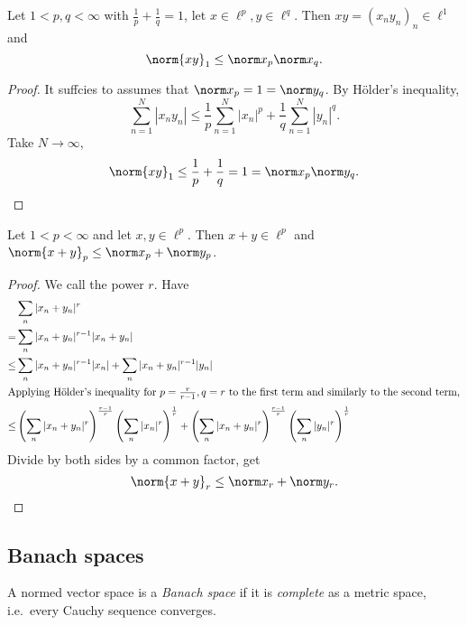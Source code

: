 \documentclass[a4paper]{article}
\begin{document}
\begin{theorem}
  Let \(1 < p, q < \infty\) with \(\frac{1}{p} + \frac{1}{q} = 1\), let \(x \in \ell^p, y \in \ell^q\). Then \(xy = (x_ny_n)_n \in \ell^1\) and
  \[
    \norm{xy}_1 \leq \norm x_p \norm x_q.
  \]
\end{theorem}

\begin{proof}
  It suffcies to assumes that \(\norm x_p = 1 = \norm y_q\). By Hölder's inequality,
  \[
    \sum_{n = 1}^N |x_n y_n| \leq \frac{1}{p} \sum_{n = 1}^N |x_n|^p + \frac{1}{q} \sum_{n = 1}^N |y_n|^q.
  \]
  Take \(N \to \infty\),
  \[
    \norm{xy}_1 \leq \frac{1}{p} + \frac{1}{q} = 1 = \norm x_p \norm y_q.
  \]
\end{proof}

\begin{theorem}
  Let \(1 < p < \infty\) and let \(x, y \in \ell^p\). Then \(x + y \in \ell^p\) and \(\norm{x + y}_p \leq \norm x_p + \norm y_p\).
\end{theorem}

\begin{proof}
  We call the power \(r\). Have
  \begin{align*}
    & \sum_n |x_n + y_n|^r \\
    =& \sum_n |x_n + y_n|^{r - 1}|x_n + y_n| \\
    \leq& \sum_n |x_n + y_n|^{r - 1} |x_n| + \sum_n |x_n + y_n|^{r - 1} |y_n| \\
    \intertext{Applying Hölder's inequality for \(p = \frac{r}{r - 1}, q = r\) to the first term and similarly to the second term,}
    \leq& \left( \sum_n |x_n + y_n|^r \right) ^{\frac{r - 1}{r}} \left( \sum_n |x_n|^r \right)^{\frac{1}{r}} + \left( \sum_n |x_n + y_n|^r \right) ^{\frac{r - 1}{r}} \left( \sum_n |y_n|^r \right)^{\frac{1}{r}}
  \end{align*}
  Divide by both sides by a common factor, get
  \[
    \norm{x + y}_r \leq \norm x_r + \norm y_r.
  \]
\end{proof}

\subsection{Banach spaces}

\begin{definition}
  A normed vector space is a \emph{Banach space} if it is \emph{complete} as a metric space, i.e.\ every Cauchy sequence converges.
\end{definition}
\end{document}
